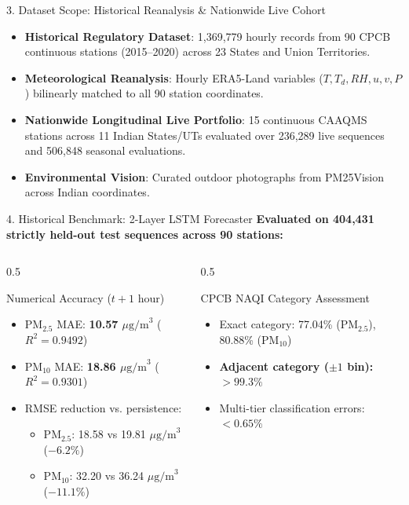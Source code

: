 \documentclass[aspectratio=169]{beamer}
\begin{document}
\begin{frame}{3. Dataset Scope: Historical Reanalysis \& Nationwide Live Cohort}
  \begin{itemize}
    \item \textbf{Historical Regulatory Dataset}: 1,369,779 hourly records from 90 CPCB continuous stations (2015--2020) across 23 States and Union Territories.
    \item \textbf{Meteorological Reanalysis}: Hourly ERA5-Land variables ($T, T_d, RH, u, v, P$) bilinearly matched to all 90 station coordinates.
    \item \textbf{Nationwide Longitudinal Live Portfolio}: 15 continuous CAAQMS stations across 11 Indian States/UTs evaluated over 236,289 live sequences and 506,848 seasonal evaluations.
    \item \textbf{Environmental Vision}: Curated outdoor photographs from PM25Vision across Indian coordinates.
  \end{itemize}
\end{frame}

\begin{frame}{4. Historical Benchmark: 2-Layer LSTM Forecaster}
  \textbf{Evaluated on 404,431 strictly held-out test sequences across 90 stations:}
  \begin{columns}
    \begin{column}{0.5\textwidth}
      \begin{block}{Numerical Accuracy ($t+1$ hour)}
        \begin{itemize}
          \item $\text{PM}_{2.5}$ MAE: \textbf{10.57 $\mu\text{g/m}^3$} ($R^2 = 0.9492$)
          \item $\text{PM}_{10}$ MAE: \textbf{18.86 $\mu\text{g/m}^3$} ($R^2 = 0.9301$)
          \item RMSE reduction vs. persistence:
            \begin{itemize}
              \item $\text{PM}_{2.5}$: 18.58 vs 19.81 $\mu\text{g/m}^3$ ($-6.2\%$)
              \item $\text{PM}_{10}$: 32.20 vs 36.24 $\mu\text{g/m}^3$ ($-11.1\%$)
            \end{itemize}
        \end{itemize}
      \end{block}
    \end{column}
    \begin{column}{0.5\textwidth}
      \begin{block}{CPCB NAQI Category Assessment}
        \begin{itemize}
          \item Exact category: 77.04\% ($\text{PM}_{2.5}$), 80.88\% ($\text{PM}_{10}$)
          \item \textbf{Adjacent category ($\pm 1$ bin): $>99.3\%$}
          \item Multi-tier classification errors: $<0.65\%$
        \end{itemize}
      \end{block}
    \end{column}
  \end{columns}
\end{frame}
\end{document}
